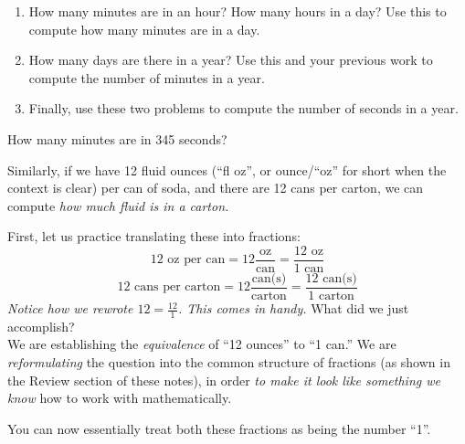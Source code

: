 \documentclass[12pt]{article}
\begin{document}
\vspace{1in}

\pagebreak

\begin{enumerate}
\item How many minutes are in an hour? How many hours in a day? Use this to compute how many minutes are in a day.
\vspace{1in}

\item How many days are there in a year? Use this and your previous work to compute the number of minutes in a year. 

\vspace{1in}
\item Finally, use these two problems to compute the number of seconds in a year.
\vspace{1in}
\end{enumerate}

How many minutes are in 345 seconds?
\vspace{1in}

\pagebreak
{}
Similarly, if we have 12 fluid ounces (``fl oz'', or ounce/``oz'' for short when the context is clear) per can of soda, and there are 12 cans per carton, we can compute \emph{how much fluid is in a carton. }

First, let us practice translating these into fractions:
$$
12 \text{ oz per can} = 12 \frac{\text{oz}}{\text{can}} = \frac{12\text{ oz}}{1\text{ can}}
$$
$$
12 \text{ cans per carton} = 12 \frac{\text{can(s)}}{\text{carton}} = \frac{12 \text{ can(s)}}{1 \text{ carton}}
$$
\emph{Notice how we rewrote $12 = \frac{12}{1}$. This comes in handy.} What did we just accomplish? \\

We are establishing the \emph{equivalence} of ``12 ounces'' to ``1 can.''
We are \emph{reformulating} the question into the common structure of fractions (as shown in the Review section of these notes), in order \emph{to make it look like something we know} how to work with mathematically.

You can now essentially treat both these fractions as being the number ``1''. 
\end{document}
